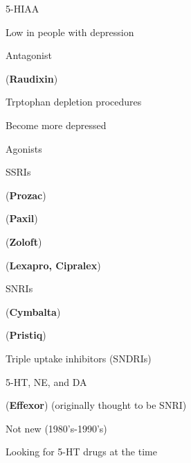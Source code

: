 \begin{coloredlist}
    \item 5-HIAA
    \begin{coloredlist}
        \item Low in people with depression
    \end{coloredlist}
    \item Antagonist
    \begin{coloredlist}
        \item {} (\textbf{Raudixin})
        \item Trptophan depletion procedures
        \item Become more depressed
    \end{coloredlist}
    \item Agonists
    \begin{coloredlist}
        \item SSRIs
        \begin{coloredlist}
            \item {} (\textbf{Prozac})
            \item {} (\textbf{Paxil})
            \item {} (\textbf{Zoloft})
            \item {} (\textbf{Lexapro, Cipralex})
        \end{coloredlist}
        \item SNRIs
        \begin{coloredlist}
            \item {} (\textbf{Cymbalta})
            \item {} (\textbf{Pristiq})
        \end{coloredlist}
        \item Triple uptake inhibitors (SNDRIs)
        \item 5-HT, NE, and DA
        \begin{coloredlist}
            \item {} (\textbf{Effexor}) (originally thought to be SNRI)
        \end{coloredlist}
        \item Not new (1980's-1990's)
        \begin{coloredlist}
            \item Looking for 5-HT drugs at the time
        \end{coloredlist}

\end{coloredlist}
\end{coloredlist}

